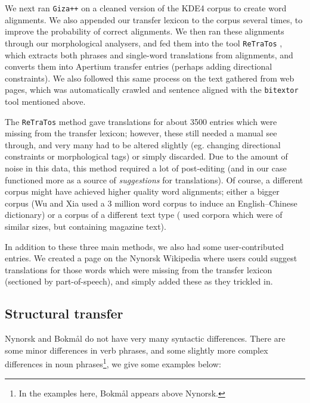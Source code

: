 \documentclass[11pt]{article}
\begin{document}
We next ran {\tt Giza++} \citep{och2003scv} on a cleaned version of the KDE4
corpus to create word alignments. We also appended our 
transfer lexicon to the corpus several times, to improve the
probability of correct alignments. We then ran these alignments
through our morphological analysers, and fed them into the tool
{\tt ReTraTos} \citep{caseli2006aib}, which extracts both phrases and
single-word translations from alignments, and converts them into
Apertium transfer entries (perhaps adding directional constraints). We
also followed this same process on the text gathered from web pages,
which was automatically crawled and sentence aligned with the {\tt bitextor}
tool mentioned above.

The {\tt ReTraTos} method gave translations for about 3500 entries
which were missing from the transfer lexicon; however, these still
needed a manual see through, and very many had to be altered slightly
(eg.  changing directional constraints or morphological tags) or
simply discarded. Due to the amount of noise in this data, this method
required a lot of post-editing (and in our case functioned more as a
source of \emph{suggestions} for translations). Of course, a different
corpus might have achieved higher quality word alignments; either a
bigger corpus (Wu and Xia \citep[1994, in][p.~230]{caseli2006aib} used
a 3 million word corpus to induce an English–Chinese dictionary) or a
corpus of a different text type (\citet{caseli2006aib} used corpora
which were of similar sizes, but containing magazine text).

In addition to these three main methods, we also had some
user-contributed entries. We created a page on the Nynorsk Wikipedia
where users could suggest translations for those words which were
missing from the transfer lexicon (sectioned by part-of-speech), and
simply added these as they trickled in.


\subsection{Structural transfer}
\label{sec:structural-transfer}
Nynorsk and Bokmål do not have very many syntactic differences. There
are some minor differences in verb phrases, and some slightly more
complex differences in noun phrases\footnote{In the examples here,
  Bokmål appears above Nynorsk.}, we give some examples below:
\end{document}
